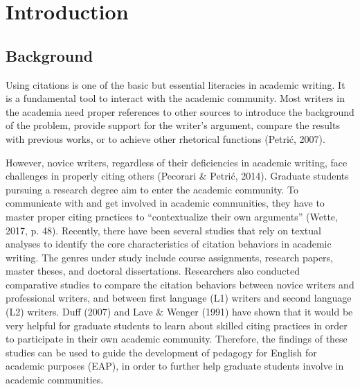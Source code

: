 \chapter{Introduction}
\label{chap:intro}

\section{Background}
Using citations is one of the basic but essential literacies in academic writing. It is a fundamental tool to interact with the academic community. Most writers in the academia need proper references to other sources to introduce the background of the problem, provide support for the writer’s argument, compare the results with previous works, or to achieve other rhetorical functions (Petrić, 2007).

However, novice writers, regardless of their deficiencies in academic writing, face challenges in properly citing others (Pecorari \& Petrić, 2014). Graduate students pursuing a research degree aim to enter the academic community. To communicate with and get involved in academic communities, they have to master proper citing practices to “contextualize their own arguments” (Wette, 2017, p. 48). Recently, there have been several studies that rely on textual analyses to identify the core characteristics of citation behaviors in academic writing. The genres under study include course assignments, research papers, master theses, and doctoral dissertations. Researchers also conducted comparative studies to compare the citation behaviors between novice writers and professional writers, and between first language (L1) writers and second language (L2) writers. Duff (2007) and Lave \& Wenger (1991) have shown that it would be very helpful for graduate students to learn about skilled citing practices in order to participate in their own academic community. Therefore, the findings of these studies can be used to guide the development of pedagogy for English for academic purposes (EAP), in order to further help graduate students involve in academic communities.

